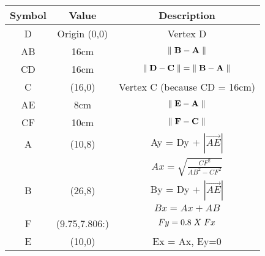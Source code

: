 \begin{tabular}{|c|c|c|}
\hline
Symbol & Value & Description\\
\hline
D & Origin (0,0) & Vertex D \\
\hline
AB & 16cm & $\|\hspace{0.1cm} \vec{B} - \vec{A} \hspace{0.1cm}\|$ \\
\hline
CD & 16cm & $\|\hspace{0.1cm} \vec{D} - \vec{C} \hspace{0.1cm}\| = \|\hspace{0.1cm} \vec{B} - \vec{A} \hspace{0.1cm}\|$ \\
\hline
C & (16,0) & Vertex C (because CD = 16cm)\\
\hline
AE & 8cm & $\|\hspace{0.1cm} \vec{E} - \vec{A} \hspace{0.1cm}\|$ \\
\hline
CF & 10cm & $\|\hspace{0.1cm} \vec{F} - \vec{C} \hspace{0.1cm}\|$ \\
\hline
A & (10,8) & Ay = Dy + $|\overrightarrow{AE}|$\\
 & & $Ax = \sqrt{\frac{CF^2}{AB^2 - CF^2}}$\\
\hline
B & (26,8) & By = Dy + $|\overrightarrow{AE}|$\\
 & & $Bx = Ax + AB$\\
\hline
F & (9.75,7.806:) & $Fy = 0.8 \hspace{0.1cm} X\hspace{0.1cm} Fx$\\
\hline
E & (10,0) & Ex = Ax, Ey=0 \\
\hline
\end{tabular}
